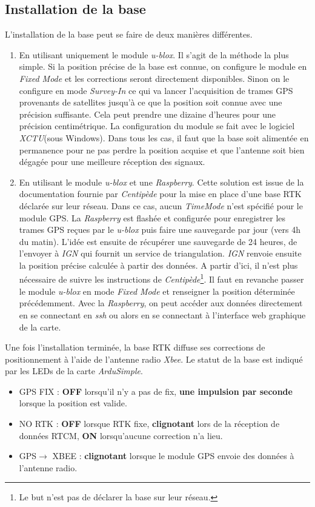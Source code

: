 \documentclass[12pt]{report}
\begin{document}
\subsection{Installation de la base}
L'installation de la base peut se faire de deux manières différentes. 
\begin{enumerate}
    \item En utilisant uniquement le module \textit{u-blox}. Il s'agit de la méthode la plus simple. Si la position précise de la base est connue, on configure le module en \textit{Fixed Mode} et les corrections seront directement disponibles. 
    Sinon on le configure en mode \textit{Survey-In} ce qui va lancer l'acquisition de trames GPS provenants de satellites jusqu'à ce que la position soit connue avec une précision suffisante. Cela peut prendre une dizaine d'heures pour une précision centimétrique. La configuration du module se fait avec le logiciel \textit{XCTU}(sous Windows). Dans tous les cas, il faut que la base soit alimentée en permanence pour ne pas perdre la position acquise et que l'antenne soit bien dégagée pour une meilleure réception des signaux.
    \item En utilisant le module \textit{u-blox} et une \textit{Raspberry}. Cette solution est issue de la documentation fournie par \textit{Centipède} pour la mise en place d'une base RTK déclarée sur leur réseau. 
    Dans ce cas, aucun \textit{TimeMode} n'est spécifié pour le module GPS. La \textit{Raspberry} est flashée et configurée pour enregistrer les trames GPS reçues par le \textit{u-blox} puis faire une sauvegarde par jour (vers 4h du matin). 
    L'idée est ensuite de récupérer une sauvegarde de 24 heures, de l'envoyer à \textit{IGN} qui fournit un service de triangulation. \textit{IGN} renvoie ensuite la position précise calculée à partir des données. 
    A partir d'ici, il n'est plus nécessaire de suivre les instructions de \textit{Centipède}\footnote{Le but n'est pas de déclarer la base sur leur réseau.}. Il faut en revanche passer le module \textit{u-blox} en mode \textit{Fixed Mode} et renseigner la position déterminée précédemment. 
    Avec la \textit{Raspberry}, on peut accéder aux données directement en se connectant en \textit{ssh} ou alors en se connectant à l'interface web graphique de la carte.
\end{enumerate}

Une fois l'installation terminée, la base RTK diffuse ses corrections de positionnement à l'aide de l'antenne radio \textit{Xbee}. Le statut de la base est indiqué par les LEDs de la carte \textit{ArduSimple}.
\begin{itemize}
    \item GPS FIX : \textbf{OFF} lorsqu'il n'y a pas de fix, \textbf{une impulsion par seconde} lorsque la position est valide.
    \item NO RTK : \textbf{OFF} lorsque RTK fixe, \textbf{clignotant} lors de la réception de données RTCM, \textbf{ON} lorsqu'aucune correction n'a lieu. 
    \item GPS$\rightarrow$ XBEE : \textbf{clignotant} lorsque le module GPS envoie des données à l'antenne radio.
\end{itemize}
\end{document}
